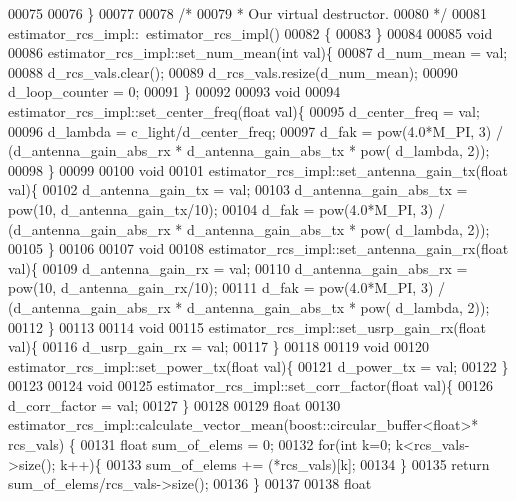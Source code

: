 \begin{DoxyCode}
00075 
00076     \}
00077 
00078     \textcolor{comment}{/*}
00079 \textcolor{comment}{     * Our virtual destructor.}
00080 \textcolor{comment}{     */}
00081     estimator_rcs_impl::~estimator_rcs_impl()
00082     \{
00083     \}
00084 
00085     \textcolor{keywordtype}{void}
00086     estimator_rcs_impl::set_num_mean(\textcolor{keywordtype}{int} val)\{
00087       d_num_mean = val;
00088       d_rcs_vals.clear();
00089       d_rcs_vals.resize(d_num_mean);
00090       d_loop_counter = 0;
00091     \}
00092 
00093     \textcolor{keywordtype}{void}
00094     estimator_rcs_impl::set_center_freq(\textcolor{keywordtype}{float} val)\{
00095       d_center_freq = val;
00096       d_lambda = c_light/d_center_freq;
00097       d_fak = pow(4.0*M\_PI, 3) / (d_antenna_gain_abs_rx * d_antenna_gain_abs_tx * pow(
      d_lambda, 2));
00098     \}
00099 
00100     \textcolor{keywordtype}{void}
00101     estimator_rcs_impl::set_antenna_gain_tx(\textcolor{keywordtype}{float} val)\{
00102       d_antenna_gain_tx = val;
00103       d_antenna_gain_abs_tx = pow(10, d_antenna_gain_tx/10);
00104       d_fak = pow(4.0*M\_PI, 3) / (d_antenna_gain_abs_rx * d_antenna_gain_abs_tx * pow(
      d_lambda, 2));
00105     \}
00106 
00107     \textcolor{keywordtype}{void}
00108     estimator_rcs_impl::set_antenna_gain_rx(\textcolor{keywordtype}{float} val)\{
00109       d_antenna_gain_rx = val;
00110       d_antenna_gain_abs_rx = pow(10, d_antenna_gain_rx/10);
00111       d_fak = pow(4.0*M\_PI, 3) / (d_antenna_gain_abs_rx * d_antenna_gain_abs_tx * pow(
      d_lambda, 2));
00112     \}
00113 
00114     \textcolor{keywordtype}{void}
00115     estimator_rcs_impl::set_usrp_gain_rx(\textcolor{keywordtype}{float} val)\{
00116       d_usrp_gain_rx = val;
00117     \}
00118 
00119     \textcolor{keywordtype}{void}
00120     estimator_rcs_impl::set_power_tx(\textcolor{keywordtype}{float} val)\{
00121       d_power_tx = val;
00122     \}
00123 
00124     \textcolor{keywordtype}{void}
00125     estimator_rcs_impl::set_corr_factor(\textcolor{keywordtype}{float} val)\{
00126       d_corr_factor = val;
00127     \}
00128 
00129     \textcolor{keywordtype}{float}
00130     estimator_rcs_impl::calculate_vector_mean(boost::circular\_buffer<float>* rcs\_vals) \{
00131       \textcolor{keywordtype}{float} sum\_of\_elems = 0;
00132       \textcolor{keywordflow}{for}(\textcolor{keywordtype}{int} k=0; k<rcs\_vals->size(); k++)\{
00133         sum\_of\_elems += (*rcs\_vals)[k];
00134       \}
00135       \textcolor{keywordflow}{return} sum\_of\_elems/rcs\_vals->size();
00136     \}
00137 
00138     \textcolor{keywordtype}{float}

\end{DoxyCode}
